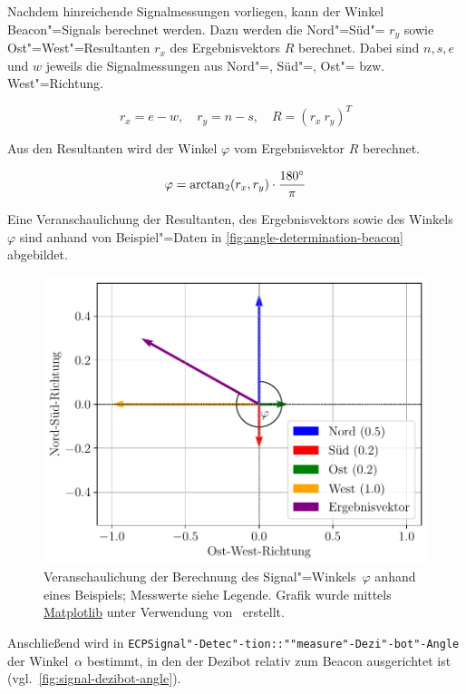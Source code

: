 {Nachdem hinreichende Signalmessungen vorliegen, kann der Winkel Beacon"=Signals berechnet werden. Dazu werden die Nord"=Süd"= $r_{y}$ sowie Ost"=West"=Resultanten $r_{x}$ des Ergebnisvektors $R$ berechnet. Dabei sind $n,s,e$ und $w$ jeweils die Signalmessungen aus Nord"=, Süd"=, Ost"= bzw. West"=Richtung.

\begin{equation*}
    r_{x} = e - w, \quad r_{y} = n - s, \quad R = (r_x~r_y)^T
\end{equation*}

Aus den Resultanten wird der Winkel $\varphi$ vom Ergebnisvektor $R$ berechnet.

\begin{equation*}
    \varphi = \arctan_2(r_{x}, r_{y}) \cdot \frac{180^\circ}{\pi}
\end{equation*}

Eine Veranschaulichung der Resultanten, des Ergebnisvektors sowie des Winkels~$\varphi$ sind anhand von Beispiel"=Daten in \autoref{fig:angle-determination-beacon} abgebildet.

\begin{figure}[h]
    \includegraphics[width=\textwidth]{../plot/signal_direction.pdf}
    \caption{Veranschaulichung der Berechnung des Signal"=Winkels~$\varphi$ anhand eines Beispiels; Messwerte siehe Legende. Grafik wurde mittels \href{https://matplotlib.org/}{Matplotlib} unter Verwendung von~\cite{matplotlibdevelopmentteamScaleInvariantAngle} erstellt.}
    \label{fig:angle-determination-beacon}
\end{figure}

Anschließend wird in \texttt{ECPSignal"-Detec"-tion::""measure"-Dezi"-bot"-Angle} der Winkel~$\alpha$ bestimmt, in den der Dezibot relativ zum Beacon ausgerichtet ist (vgl.~\autoref{fig:signal-dezibot-angle}).

}

